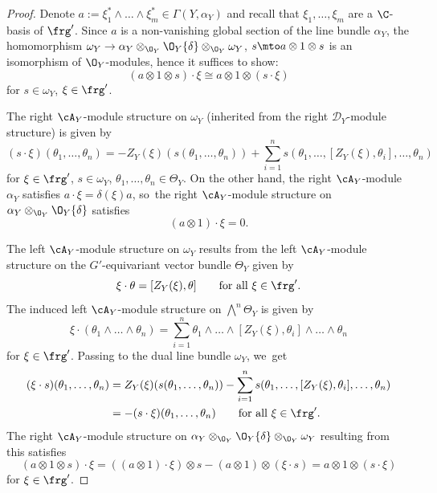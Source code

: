 \begin{proof}
Denote $a := \xi_1^* \wedge \dots \wedge \xi_m^* \in \Gamma(Y,\alpha_Y)$ and recall that $\xi_1,\dots,\xi_m$ are a $\C$-basis of $\frg'$. Since $a$ is a non-vanishing global section of the line bundle $\alpha_Y$, the homomorphism $\omega_Y \to \alpha_Y \otimes_{\O_Y} \O_Y\{\delta\} \otimes_{\O_Y} \omega_Y$, $s \mto a \otimes 1 \otimes s$ is an isomorphism of $\O_Y$\nobreakdash-mod\-ules, hence it suffices to show:
\[
(a \otimes 1 \otimes s) \cdot \xi \cong a \otimes 1 \otimes (s \cdot \xi)
\]
for $s \in \omega_Y$, $\xi \in \frg'$.

The right $\cA_Y$\nobreakdash-mod\-ule structure on $\omega_Y$ (inherited from the right $\mathscr{D}_Y$\nobreakdash-mod\-ule structure) is given by
\[
(s \cdot \xi)(\theta_1,\dots,\theta_n) = -Z_Y(\xi)(s(\theta_1,\dots,\theta_n))+\sum_{i=1}^n s(\theta_1,\dots,[Z_Y(\xi),\theta_i],\dots,\theta_n)
\]
for $\xi \in \frg'$, $s \in \omega_Y$, $\theta_1,\dots, \theta_n \in \Theta_Y$. On the other hand, the right $\cA_Y$\nobreakdash-mod\-ule $\alpha_Y$ satisfies $a \cdot \xi = \delta(\xi) a$, so~the right $\cA_Y$\nobreakdash-mod\-ule structure on $\alpha_Y \otimes_{\O_Y} \O_Y\{\delta\}$ satisfies
\[
(a \otimes 1) \cdot \xi = 0.
\]

The left $\cA_Y$\nobreakdash-mod\-ule structure on $\omega_Y$ results from the left $\cA_Y$\nobreakdash-mod\-ule structure on the $G'$-equivariant vector bundle $\Theta_Y$ given by
\[
\xi \cdot \theta = [Z_Y(\xi),\theta] \qquad \text{for all } \xi \in \frg'.
\]
The induced left $\cA_Y$\nobreakdash-mod\-ule structure on $\bigwedge^n \Theta_Y$ is given by
\[
\xi \cdot (\theta_1 \wedge \dots \wedge \theta_n) = \sum_{i=1}^n \theta_1 \wedge \dots \wedge [Z_Y(\xi),\theta_i] \wedge \dots \wedge \theta_n
\]
for $\xi \in \frg'$. Passing to the dual line bundle $\omega_Y$, we~get
\begin{align*}(\xi \cdot s)(\theta_1,\dots,\theta_n) &= Z_Y(\xi)(s(\theta_1,\dots,\theta_n))-\sum_{i=1}^n s(\theta_1,\dots,[Z_Y(\xi),\theta_i],\dots,\theta_n) \\
&= -(s \cdot \xi)(\theta_1,\dots,\theta_n) \qquad \text{for all }\xi \in \frg'.
\end{align*}
The right $\cA_Y$\nobreakdash-mod\-ule structure on $\alpha_Y \otimes_{\O_Y} \O_Y\{\delta\} \otimes_{\O_Y} \omega_Y$ resulting from this satisfies
\[
(a \otimes 1 \otimes s) \cdot \xi
= ((a \otimes 1) \cdot \xi) \otimes s - (a \otimes 1) \otimes (\xi \cdot s) = a \otimes 1 \otimes (s \cdot \xi)
\]
for $\xi \in \frg'$.
\end{proof}

